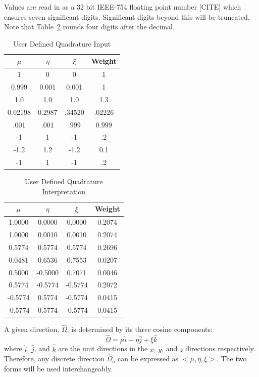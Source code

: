 Values are read in as a 32 bit IEEE-754 floating point number [CITE] which ensures seven significant digits. Significant digits beyond this will be truncated. Note that Table~\ref{tab:quad_interp} rounds four digits after the decimal.

\begin{table}[ht]
\caption{User Defined Quadrature Input}
\centering 
\begin{tabular}{c c c c}
\hline \hline   
$\mu$    & $\eta$ & $\xi$ & Weight\\ [0.5ex] 
\hline
1        & 0      & 0      & 1 \\
0.999    & 0.001  & 0.001  & 1 \\
1.0      & 1.0    & 1.0    & 1.3 \\
0.02198  & 0.2987 & .34520 & .02226 \\
.001     & .001   & .999   & 0.999 \\
-1       & 1      & -1     & .2 \\
-1.2     & 1.2    & -1.2   & 0.1 \\
-1        & 1     & -1     & .2 \\ [1ex]
\hline
\end{tabular}
\label{tab:quad_format}
\end{table}

\begin{table}[ht]
\caption{User Defined Quadrature Interpretation}
\centering 
\begin{tabular}{c c c c}
\hline \hline   
$\mu$    & $\eta$ & $\xi$ & Weight\\ [0.5ex] 
\hline
 1.0000  &  0.0000  &  0.0000  & 0.2074 \\
 1.0000  &  0.0010  &  0.0010  & 0.2074 \\
 0.5774  &  0.5774  &  0.5774  & 0.2696 \\
 0.0481  &  0.6536  &  0.7553  & 0.0207 \\
 0.5000  & -0.5000  &  0.7071  & 0.0046 \\
 0.5774  & -0.5774  & -0.5774  & 0.2072 \\
-0.5774  &  0.5774  & -0.5774  & 0.0415 \\
-0.5774  &  0.5774  & -0.5774  & 0.0415 \\ [1ex]
\hline
\end{tabular}
\label{tab:quad_interp}
\end{table}

A given direction, $\hat{\Omega}$, is determined by its three cosine components: 
\begin{equation} \label{eq:omega_cos}
\hat{\Omega} = \mu \hat{i} + \eta \hat{j} + \xi \hat{k}
\end{equation}
where $\hat{i}$, $\hat{j}$, and $\hat{k}$ are the unit directions in the $x$, $y$, and $z$ directions respectively. Therefore, any discrete direction $\hat{\Omega}_a$ can be expressed as $<\mu, \eta, \xi>$. The two forms will be used interchangeably.

